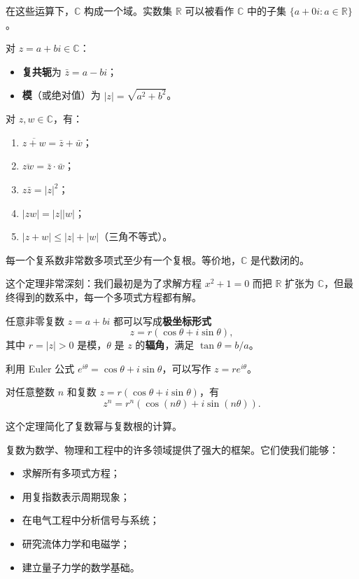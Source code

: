 在这些运算下，$\mathbb{C}$ 构成一个域。实数集 $\mathbb{R}$ 可以被看作 $\mathbb{C}$ 中的子集 $\{a+0i:a\in \mathbb{R}\}$。

\begin{definition}[复共轭与模]
对 $z=a+bi\in \mathbb{C}$：
\begin{itemize}
    \item \textbf{复共轭}为 $\bar z=a-bi$；
    \item \textbf{模}（或绝对值）为 $|z|=\sqrt{a^2+b^2}$。
\end{itemize}
\end{definition}

\begin{theorem}[共轭与模的性质]
对 $z,w\in \mathbb{C}$，有：
\begin{enumerate}
    \item $\overline{z+w}=\bar z+\bar w$；
    \item $\overline{zw}=\bar z\cdot \bar w$；
    \item $z\bar z=|z|^2$；
    \item $|zw|=|z||w|$；
    \item $|z+w|\le |z|+|w|$（三角不等式）。
\end{enumerate}
\end{theorem}

\begin{theorem}[代数基本定理]
每一个复系数非常数多项式至少有一个复根。等价地，$\mathbb{C}$ 是代数闭的。
\end{theorem}

这个定理非常深刻：我们最初是为了求解方程 $x^2+1=0$ 而把 $\mathbb{R}$ 扩张为 $\mathbb{C}$，但最终得到的数系中，每一个多项式方程都有解。

\begin{definition}[复数的极坐标形式]
任意非零复数 $z=a+bi$ 都可以写成\textbf{极坐标形式}
\[
z=r(\cos\theta+i\sin\theta),
\]
其中 $r=|z|>0$ 是模，$\theta$ 是 $z$ 的\textbf{辐角}，满足 $\tan\theta=b/a$。
\end{definition}

利用 Euler 公式 $e^{i\theta}=\cos\theta+i\sin\theta$，可以写作 $z=re^{i\theta}$。

\begin{theorem}[De Moivre 定理]
对任意整数 $n$ 和复数 $z=r(\cos\theta+i\sin\theta)$，有
\[
z^n=r^n(\cos(n\theta)+i\sin(n\theta)).
\]
\end{theorem}

这个定理简化了复数幂与复数根的计算。

复数为数学、物理和工程中的许多领域提供了强大的框架。它们使我们能够：
\begin{itemize}
    \item 求解所有多项式方程；
    \item 用复指数表示周期现象；
    \item 在电气工程中分析信号与系统；
    \item 研究流体力学和电磁学；
    \item 建立量子力学的数学基础。
\end{itemize}

